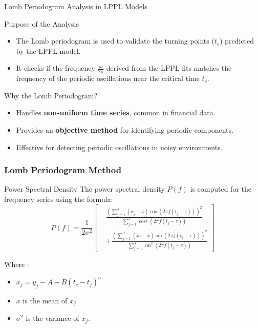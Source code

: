 \documentclass{beamer}
\begin{document}
\begin{frame}{Lomb Periodogram Analysis in LPPL Models}
    \begin{block}{Purpose of the Analysis}
        \begin{itemize}
            \item The Lomb periodogram is used to validate the turning points (\(t_c\)) predicted by the LPPL model.
            \item It checks if the frequency \(\frac{\omega}{2\pi}\) derived from the LPPL fits matches the frequency of the periodic oscillations near the critical time \(t_c\).
        \end{itemize}
    \end{block}
    \begin{block}{Why the Lomb Periodogram?}
        \begin{itemize}
            \item Handles \textbf{non-uniform time series}, common in financial data.
            \item Provides an \textbf{objective method} for identifying periodic components.
            \item Effective for detecting periodic oscillations in noisy environments.
        \end{itemize}
    \end{block}
\end{frame}

\begin{frame}
\frametitle{Lomb Periodogram Method}
    \begin{block}{Power Spectral Density}
        The power spectral density \( P(f) \) is computed for the frequency series using the formula:
        \small
        \[
        P(f) = \frac{1}{2\sigma^2} \left[
        \begin{aligned}
        & \frac{
        \left( \sum_{j=1}^J (x_j - \bar{x}) \cos \left( 2\pi f (t_j - \tau) \right) \right)^2
        }{
        \sum_{j=1}^J \cos^2 \left( 2\pi f (t_j - \tau) \right)
        } \\
        & + \frac{
        \left( \sum_{j=1}^J (x_j - \bar{x}) \sin \left( 2\pi f (t_j - \tau) \right) \right)^2
        }{
        \sum_{j=1}^J \sin^2 \left( 2\pi f (t_j - \tau) \right)
        }
        \end{aligned}
        \right]
        \]
        \raggedright
        Where :
        \begin{itemize}
            \item \( x_j = y_j - A - B (t_c - t_j)^a \)
            \item \( \bar{x} \) is the mean of \( x_j \)
            \item \( \sigma^2 \) is the variance of \( x_j \).
        \end{itemize}
    \end{block}
\end{frame}
\end{document}
